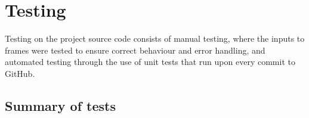 \documentclass[./project-report/src/latex/project-report.tex]{subfiles}
\begin{document}
\maketitle

\clearpage
\section{Testing}

Testing on the project source code consists of manual testing, where the inputs to frames were tested to ensure correct behaviour and error handling, and automated testing 
through the use of unit tests that run upon every commit to GitHub.

\subsection{Summary of tests}
\end{document}

